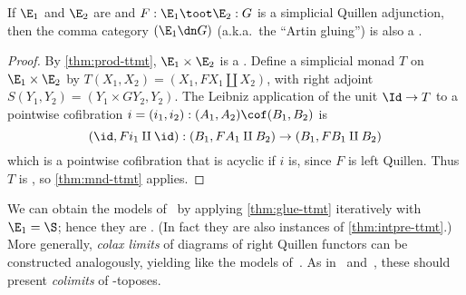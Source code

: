 \begin{cor}\label{thm:glue-ttmt}
  If $\E_1$ and $\E_2$ are \ttmts and $F:\E_1 \toot \E_2 : G$ is a simplicial Quillen adjunction, then the comma category $(\E_1\dn G)$ (a.k.a.\ the ``Artin gluing'') is also a \ttmt.
\end{cor}
\begin{proof}
  By \cref{thm:prod-ttmt}, $\E_1\times \E_2$ is a \ttmt.
  Define a simplicial monad $T$ on $\E_1\times \E_2$ by $T(X_1,X_2) = (X_1, F X_1 \amalg X_2)$, with right adjoint $S(Y_1,Y_2) = (Y_1 \times G Y_2, Y_2)$.
  The Leibniz application of the unit $\Id \to T$ to a pointwise cofibration $i = (i_1,i_2) : (A_1,A_2) \cof (B_1,B_2)$ is
  \[ (\id, F i_1 \amalg \id) : (B_1, F A_1 \amalg B_2) \to (B_1, F B_1 \amalg B_2 ) \]
  which is a pointwise cofibration that is acyclic if $i$ is, since $F$ is left Quillen.
  Thus $T$ is \qucoft, so \cref{thm:mnd-ttmt} applies.
\end{proof}

We can obtain the models of~\cite{shulman:eiuniv} by applying \cref{thm:glue-ttmt} iteratively with $\E_1=\S$; hence they are \ttmts.
(In fact they are also instances of \cref{thm:intpre-ttmt}.)
More generally, \emph{colax limits} of diagrams of right Quillen functors can be constructed analogously, yielding \ttmts like the models of~\cite[]{shulman:invdia}.
As in~\cite[B3.4]{ptj:elephant} and~\cite[.2]{lurie:higher-topoi}, these should present \emph{colimits} of \io-toposes.


